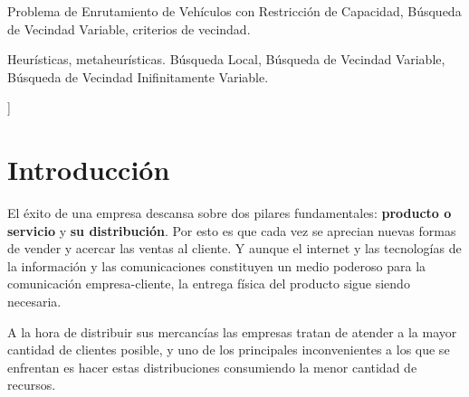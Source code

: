 \documentclass[a4paper,10pt,twocolumn]{article}
\begin{document}
\begin{keywords}
	Problema de Enrutamiento de Vehículos con Restricción de Capacidad, Búsqueda de
	Vecindad Variable, criterios de vecindad.
\end{keywords}

\begin{topics}
	Heurísticas, metaheurísticas. Búsqueda Local, Búsqueda de Vecindad Variable, 
	Búsqueda de Vecindad Inifinitamente Variable.
\end{topics}


\vspace{0.8cm}
]



\section{Introducción}\label{sec:intro}
  	El éxito de una empresa descansa sobre dos pilares fundamentales: \textbf{producto 
  	o servicio} y \textbf{su distribución}. Por esto es que cada vez se aprecian nuevas
  	formas de vender y acercar las ventas al cliente. Y aunque el internet y las 
  	tecnologías de la información y las comunicaciones constituyen un medio poderoso 
  	para la comunicación empresa-cliente, la entrega física del producto sigue siendo 
  	necesaria.
  	
  	A la hora de distribuir sus mercancías las empresas tratan de atender a 
  	la mayor cantidad de clientes posible, y uno de los principales inconvenientes a 
  	los que se enfrentan es hacer estas distribuciones consumiendo la menor cantidad 
  	de recursos.
\end{document}
